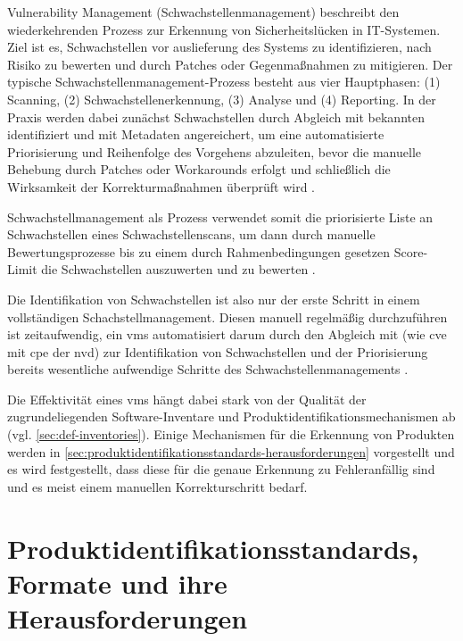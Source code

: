 Vulnerability Management (Schwachstellenmanagement) beschreibt den wiederkehrenden Prozess zur Erkennung von Sicherheitslücken in IT-Systemen.
Ziel ist es, Schwachstellen vor auslieferung des Systems zu identifizieren, nach Risiko zu bewerten und durch Patches oder Gegenmaßnahmen zu mitigieren.
Der typische Schwachstellenmanagement-Prozess besteht aus vier Hauptphasen: (1) Scanning, (2) Schwachstellenerkennung, (3) Analyse und (4) Reporting.
In der Praxis werden dabei zunächst Schwachstellen durch Abgleich mit bekannten  identifiziert und mit Metadaten angereichert, um eine automatisierte Priorisierung und Reihenfolge des Vorgehens abzuleiten, bevor die manuelle Behebung durch Patches oder Workarounds erfolgt und schließlich die Wirksamkeit der Korrekturmaßnahmen überprüft wird \autocite{foreman2019vulnerabilityManagement}.

Schwachstellmanagement als Prozess verwendet somit die priorisierte Liste an Schwachstellen eines Schwachstellenscans, um dann durch manuelle Bewertungsprozesse bis zu einem durch Rahmenbedingungen gesetzen Score-Limit die Schwachstellen auszuwerten und zu bewerten \autocite{foreman2019vulnerabilityManagement}.

Die Identifikation von Schwachstellen ist also nur der erste Schritt in einem vollständigen Schachstellmanagement.
Diesen manuell regelmäßig durchzuführen ist zeitaufwendig, ein \acrshort{vms} automatisiert darum durch den Abgleich mit  (wie \acrshort{cve} mit \acrshort{cpe} der \acrshort{nvd}) zur Identifikation von Schwachstellen und der Priorisierung bereits wesentliche aufwendige Schritte des Schwachstellenmanagements \autocite{Idrissi_Sebai_Faroukhi_Mahouachi_2024}.

Die Effektivität eines \acrshort{vms} hängt dabei stark von der Qualität der zugrundeliegenden Software-Inventare und Produktidentifikationsmechanismen ab (vgl. \autoref{sec:def-inventories}).
Einige Mechanismen für die Erkennung von Produkten werden in \autoref{sec:produktidentifikationsstandards-herausforderungen} vorgestellt und es wird festgestellt, dass diese für die genaue Erkennung zu Fehleranfällig sind und es meist einem manuellen Korrekturschritt bedarf.


\section{Produktidentifikationsstandards, Formate und ihre Herausforderungen}\label{sec:produktidentifikationsstandards-herausforderungen}

